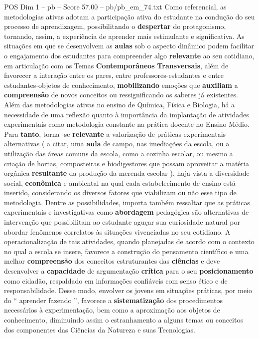 \begin{textsample}{POS Dim 1 – pb – Score 57.00 – pb/pb\_em\_74.txt}
Como referencial, as metodologias ativas adotam a participação ativa do estudante na condução do seu processo de aprendizagem, possibilitando o \textbf{despertar} do protagonismo, tornando, assim, a experiência de aprender mais estimulante e significativa.
As situações em que se desenvolvem as \textbf{aulas} sob o aspecto dinâmico podem facilitar o engajamento dos estudantes para compreender algo \textbf{relevante} ao seu cotidiano, em articulação com os Temas \textbf{Contemporâneos} \textbf{Transversais}, além de favorecer a interação entre os pares, entre professores-estudantes e entre estudantes-objetos de conhecimento, \textbf{mobilizando} emoções que \textbf{auxiliam} a \textbf{compreensão} de novos conceitos ou ressignificando os saberes já existentes.
Além das metodologias ativas no ensino de Química, Física e Biologia, há a necessidade de uma reflexão quanto à importância da implantação de atividades experimentais como metodologia constante na prática docente no Ensino Médio.
Para \textbf{tanto}, torna -se \textbf{relevante} a valorização de práticas experimentais alternativas ( a citar, uma \textbf{aula} de campo, nas imediações da escola, ou a utilização das áreas comuns da escola, como a cozinha escolar, ou mesmo a criação de hortas, composteiras e biodigestores que possam aproveitar a matéria orgânica \textbf{resultante} da produção da merenda escolar ), haja vista a diversidade social, \textbf{econômica} e ambiental na qual cada estabelecimento de ensino está inserido, considerando os diversos fatores que viabilizam ou não esse tipo de metodologia.
Dentre as possibilidades, importa também ressaltar que as práticas experimentais e investigativas como \textbf{abordagem} pedagógica são alternativas de intervenção que possibilitam ao estudante aguçar sua curiosidade natural por abordar fenômenos correlatos às situações vivenciadas no seu cotidiano.
A operacionalização de tais atividades, quando planejadas de acordo com o contexto no qual a escola se insere, favorece a construção do pensamento científico e uma melhor \textbf{compreensão} dos conceitos estruturantes das \textbf{ciências} e deve desenvolver a \textbf{capacidade} de argumentação \textbf{crítica} para o seu \textbf{posicionamento} como cidadão, respaldado em informações confiáveis com senso ético e de responsabilidade.
Desse modo, envolver os jovens em situações práticas, por meio do “ aprender fazendo ”, favorece a \textbf{sistematização} dos procedimentos necessários à experimentação, bem como a aproximação aos objetos de conhecimento, diminuindo assim o estranhamento a alguns temas ou conceitos dos componentes das Ciências da Natureza e suas Tecnologias.

\end{textsample}
